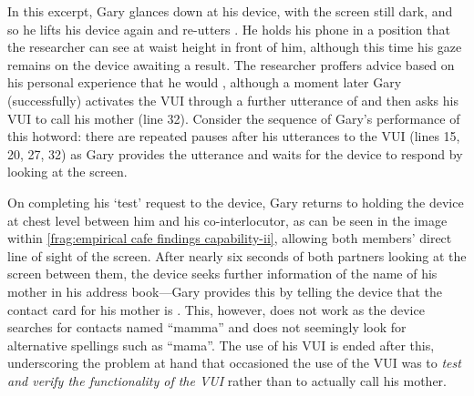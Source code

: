 \begin{revisedsubmission}
In this excerpt, Gary glances down at his device, with the screen still dark, and so he lifts his device again and re-utters .
He holds his phone in a position that the researcher can see at waist height in front of him, although this time his gaze remains on the device awaiting a result.
The researcher proffers advice based on his personal experience that he would , although a moment later Gary (successfully) activates the \ac{VUI} through a further utterance of  and then asks his \ac{VUI} to call his mother (line 32).
Consider the sequence of Gary's performance of this hotword: there are repeated pauses after his utterances to the \ac{VUI} (lines 15, 20, 27, 32) as Gary provides the utterance and waits for the device to respond by looking at the screen.

On completing his `test' request to the device, Gary returns to holding the device at chest level between him and his co-interlocutor, as can be seen in the image within \autoref{frag:empirical cafe findings capability-ii}, allowing both members' direct line of sight of the screen.
After nearly six seconds of both partners looking at the screen between them, the device seeks further information of the name of his mother in his address book---Gary provides this by telling the device that the contact card for his mother is .
This, however, does not work as the device searches for contacts named ``mamma'' and does not seemingly look for alternative spellings such as ``mama''.
The use of his \ac{VUI} is ended after this, underscoring the problem at hand that occasioned the use of the \ac{VUI} was to \textit{test and verify the functionality of the \ac{VUI}} rather than to actually call his mother.
\end{revisedsubmission}






